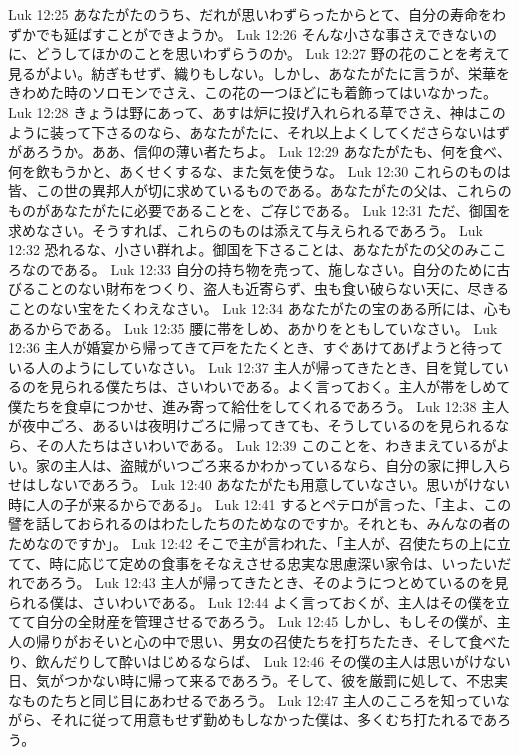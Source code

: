 Luk 12:25  あなたがたのうち、だれが思いわずらったからとて、自分の寿命をわずかでも延ばすことができようか。
Luk 12:26  そんな小さな事さえできないのに、どうしてほかのことを思いわずらうのか。
Luk 12:27  野の花のことを考えて見るがよい。紡ぎもせず、織りもしない。しかし、あなたがたに言うが、栄華をきわめた時のソロモンでさえ、この花の一つほどにも着飾ってはいなかった。
Luk 12:28  きょうは野にあって、あすは炉に投げ入れられる草でさえ、神はこのように装って下さるのなら、あなたがたに、それ以上よくしてくださらないはずがあろうか。ああ、信仰の薄い者たちよ。
Luk 12:29  あなたがたも、何を食べ、何を飲もうかと、あくせくするな、また気を使うな。
Luk 12:30  これらのものは皆、この世の異邦人が切に求めているものである。あなたがたの父は、これらのものがあなたがたに必要であることを、ご存じである。
Luk 12:31  ただ、御国を求めなさい。そうすれば、これらのものは添えて与えられるであろう。
Luk 12:32  恐れるな、小さい群れよ。御国を下さることは、あなたがたの父のみこころなのである。
Luk 12:33  自分の持ち物を売って、施しなさい。自分のために古びることのない財布をつくり、盗人も近寄らず、虫も食い破らない天に、尽きることのない宝をたくわえなさい。
Luk 12:34  あなたがたの宝のある所には、心もあるからである。
Luk 12:35  腰に帯をしめ、あかりをともしていなさい。
Luk 12:36  主人が婚宴から帰ってきて戸をたたくとき、すぐあけてあげようと待っている人のようにしていなさい。
Luk 12:37  主人が帰ってきたとき、目を覚しているのを見られる僕たちは、さいわいである。よく言っておく。主人が帯をしめて僕たちを食卓につかせ、進み寄って給仕をしてくれるであろう。
Luk 12:38  主人が夜中ごろ、あるいは夜明けごろに帰ってきても、そうしているのを見られるなら、その人たちはさいわいである。
Luk 12:39  このことを、わきまえているがよい。家の主人は、盗賊がいつごろ来るかわかっているなら、自分の家に押し入らせはしないであろう。
Luk 12:40  あなたがたも用意していなさい。思いがけない時に人の子が来るからである」。
Luk 12:41  するとペテロが言った、「主よ、この譬を話しておられるのはわたしたちのためなのですか。それとも、みんなの者のためなのですか」。
Luk 12:42  そこで主が言われた、「主人が、召使たちの上に立てて、時に応じて定めの食事をそなえさせる忠実な思慮深い家令は、いったいだれであろう。
Luk 12:43  主人が帰ってきたとき、そのようにつとめているのを見られる僕は、さいわいである。
Luk 12:44  よく言っておくが、主人はその僕を立てて自分の全財産を管理させるであろう。
Luk 12:45  しかし、もしその僕が、主人の帰りがおそいと心の中で思い、男女の召使たちを打ちたたき、そして食べたり、飲んだりして酔いはじめるならば、
Luk 12:46  その僕の主人は思いがけない日、気がつかない時に帰って来るであろう。そして、彼を厳罰に処して、不忠実なものたちと同じ目にあわせるであろう。
Luk 12:47  主人のこころを知っていながら、それに従って用意もせず勤めもしなかった僕は、多くむち打たれるであろう。
